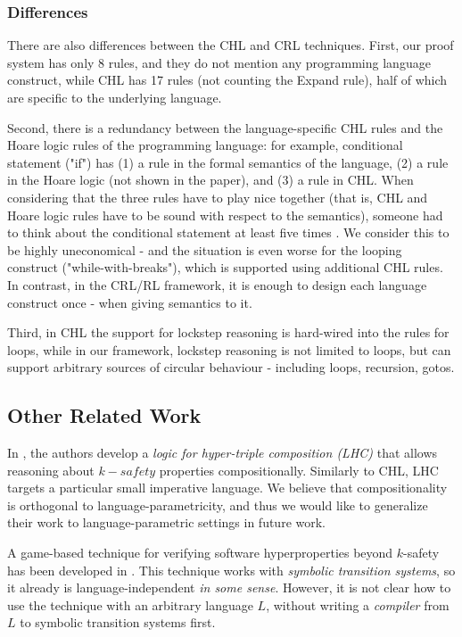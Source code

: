 \subsubsection{Differences}
There are also differences between the CHL and CRL techniques.
First, our proof system has only 8 rules, and they do not mention any programming language construct,
while CHL has 17 rules (not counting the Expand rule), half of which are specific to the underlying language.

Second, there is a redundancy between the language-specific CHL rules and the Hoare logic rules of the
programming language: for example, conditional statement ("if") has (1) a rule in the formal semantics of the language,
(2) a rule in the Hoare logic (not shown in the paper), and (3) a rule in CHL.
When considering that the three rules have to play nice together (that is, CHL and Hoare logic rules have to be sound with respect to the semantics), someone had to think about the conditional statement at least five times .
We consider this to be highly uneconomical
- and the situation
is even worse for the looping construct ("while-with-breaks"), which is supported using additional CHL rules.
In contrast, in the CRL/RL framework, it is enough to design each language construct once - when giving
semantics to it.


Third, in CHL the support for lockstep reasoning is hard-wired into the rules for loops,
while in our framework, lockstep reasoning is not limited to loops, but can support arbitrary sources
of circular behaviour - including loops, recursion, gotos.

\subsection{Other Related Work}

In \cite{DOsualdoFD22}, the authors develop a \emph{logic for hyper-triple composition (LHC)}
that allows reasoning about $k-safety$ properties compositionally.
Similarly to CHL, LHC targets a particular small imperative language.
We believe that compositionality is orthogonal to language-parametricity,
and thus we would like to generalize their work to language-parametric settings in future work.

A game-based technique for verifying software hyperproperties beyond $k$-safety
has been developed in \cite{BeutnerF22}.
This technique works with \emph{symbolic transition systems},
so it already is language-independent \emph{in some sense}. However, it is not clear how to use the technique
with an arbitrary language $L$, without writing a \emph{compiler} from $L$ to symbolic transition systems first.
